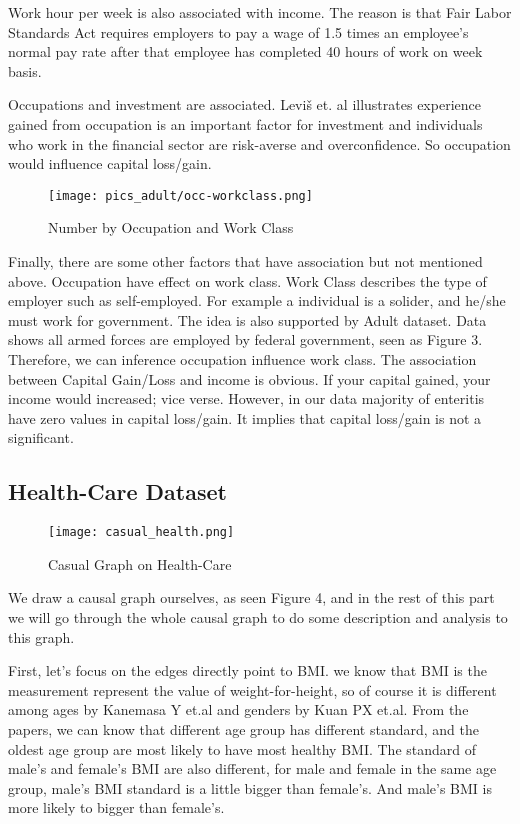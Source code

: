 \documentclass[letterpaper,12pt]{article}
\begin{document}
Work hour per week is also associated with income. The reason is that Fair Labor Standards Act requires employers to pay a wage of 1.5 times an employee's normal pay rate after that employee has completed 40 hours of work on week basis.\par

Occupations and investment are associated. Levi{\v{s}} et. al\cite{levivsauskaite2012impact} illustrates experience gained from occupation is an important factor for investment and individuals who work in the financial sector are risk-averse and overconfidence. So occupation would influence capital loss/gain. \par

\begin{figure}[htb]
\centering
\texttt{[image: pics\_adult/occ-workclass.png]}
\caption{Number by Occupation and Work Class}
\label{fig:pathdemo}
\end{figure}

Finally, there are some other factors that have association but not mentioned above.  Occupation have effect on work class. Work Class describes the type of employer such as self-employed. For example a individual is a solider, and he/she must work for government. The idea is also supported by Adult dataset. Data shows all armed forces are employed by federal government, seen as Figure 3. Therefore, we can inference occupation influence work class. The association between Capital Gain/Loss and income is obvious. If your capital gained, your income would increased; vice verse. However, in our data majority of enteritis have zero values in capital loss/gain. It implies that capital loss/gain is not a significant. \par 


\subsection{Health-Care Dataset}
\begin{figure}[htb]
\centering
\texttt{[image: casual\_health.png]}
\caption{Casual Graph on Health-Care}
\label{fig:pathdemo}
\end{figure}

We draw a causal graph ourselves, as seen Figure 4, and in the rest of this part we will go through the whole causal graph to do some description and analysis to this graph.\par

First, let’s focus on the edges directly point to BMI. we know that BMI is the measurement represent the value of weight-for-height, so of course it is different among ages by Kanemasa Y et.al\cite{kanemasa2018analysis} and genders by Kuan PX et.al\cite{kuan2011gender}. From the papers, we can know that different age group has different standard, and the oldest age group are most likely to have most healthy BMI. The standard of male’s and female’s BMI are also different, for male and female in the same age group, male’s BMI standard is a little bigger than female’s. And male’s BMI is more likely to bigger than female’s. \par
\end{document}
